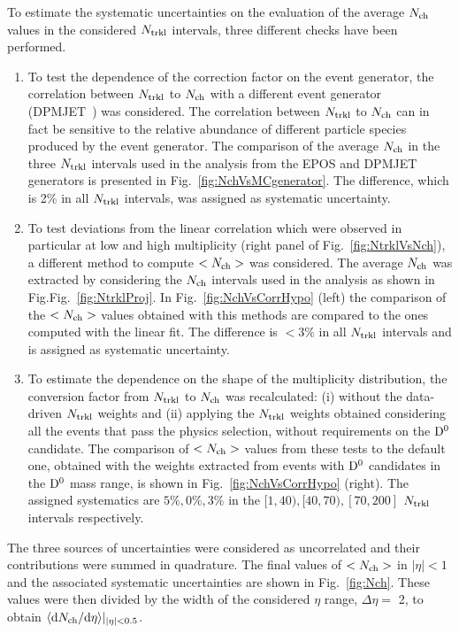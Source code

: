 To estimate the systematic uncertainties on the evaluation of the average 
$N_{\rm ch}$ values in the considered $N_{\rm trkl}$ intervals, three different checks have been performed.
\begin{enumerate}
\item To test the dependence of the correction factor on the event generator, the correlation between
$N_{\rm trkl}$ to $N_{\rm ch}$ with a different event generator (DPMJET~\cite{Ranft:1994fd}) was considered. The correlation
between $N_{\rm trkl}$ to $N_{\rm ch}$ can in fact be sensitive to the relative abundance of different particle species
produced by the event generator. The comparison of the average $N_{\rm ch}$ in the three $N_{\rm trkl}$ intervals
used in the analysis from the EPOS and DPMJET generators
is presented in Fig.~\ref{fig:NchVsMCgenerator}. The difference, which is 2\% in all $N_{\rm trkl}$ intervals,
was assigned as systematic uncertainty.
\item To test deviations from the linear correlation which were observed in particular at low and high multiplicity (right panel of Fig.~\ref{fig:NtrklVsNch}), a different method to compute $<N_{\rm ch}>$ was considered.  
The average $N_{\rm ch}$ was extracted by considering the $N_{\rm ch}$ intervals used in the analysis as shown in Fig.Fig.~\ref{fig:NtrklProj}.
In Fig.~\ref{fig:NchVsCorrHypo} (left) the comparison of the $<N_{\rm ch}>$ values
obtained with this methods are compared to the ones computed with the linear fit. The difference
is $<3\%$ in all $N_{\rm trkl}$ intervals and is assigned as systematic uncertainty.
\item To estimate the dependence on the shape of the multiplicity distribution,
the conversion factor from $N_{\rm trkl}$ to $N_{\rm ch}$ was recalculated: (i) without the data-driven 
$N_{\rm trkl}$ weights and (ii) applying the $N_{\rm trkl}$ weights obtained considering all 
the events that pass the physics selection, without requirements on the 
${\rm D^0}$ candidate. The comparison of $<N_{\rm ch}>$ values from these tests to the default one, 
obtained with the weights extracted from events with ${\rm D^0}$ candidates in the ${\rm D^0}$ mass range, 
is shown in Fig.~\ref{fig:NchVsCorrHypo} (right). The assigned systematics are $5\%, 0\%, 3\%$ in the 
$[1,40), [40,70), [70,200]$ $N_{\rm trkl}$ intervals respectively.
\end{enumerate}
The three sources of uncertainties were considered as 
uncorrelated and their contributions were summed in quadrature. The final values of $<N_{\rm ch}>$ in $|\eta|<1$ 
and the associated systematic uncertainties are shown in 
Fig.~\ref{fig:Nch}. These values were then divided by the 
width of the considered $\eta$ range, $\Delta \eta =$ 2, 
to obtain $\langle {\rm d} N_{\rm ch}/{\rm d}  \eta \rangle |_{|\eta|<0.5}$.\\



